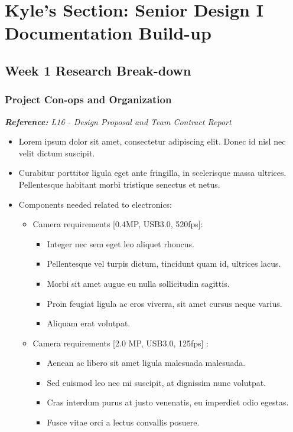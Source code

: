 \documentclass[11pt,letterpaper]{article}
\begin{document}
\tableofcontents
\newpage

\section{Kyle's Section: Senior Design I Documentation Build-up}
\subsection{Week 1 Research Break-down}
\subsubsection{Project Con-ops and Organization}
\textit{\footnotesize{\textbf{Reference:} L16 - Design Proposal and Team Contract Report}} 
\begin{itemize} %
	\item Lorem ipsum dolor sit amet, consectetur adipiscing elit. Donec id nisl nec velit dictum suscipit. 
	\item Curabitur porttitor ligula eget ante fringilla, in scelerisque massa ultrices. Pellentesque habitant morbi tristique senectus et netus.
	\item Components needed related to electronics:
	\begin{itemize}[label=$-$] %
		\item Camera requirements [0.4MP, USB3.0, 520fps]: 
			\begin{itemize} %
			\item Integer nec sem eget leo aliquet rhoncus.
			\item Pellentesque vel turpis dictum, tincidunt quam id, ultrices lacus.
			\item Morbi sit amet augue eu nulla sollicitudin sagittis.
			\item Proin feugiat ligula ac eros viverra, sit amet cursus neque varius. 
			\item Aliquam erat volutpat.
			\end{itemize}
			
		\item Camera requirements [2.0 MP, USB3.0, 125fps] : 
			\begin{itemize} %
			\item Aenean ac libero sit amet ligula malesuada malesuada.
			\item Sed euismod leo nec mi suscipit, at dignissim nunc volutpat.
			\item Cras interdum purus at justo venenatis, eu imperdiet odio egestas.
			\item Fusce vitae orci a lectus convallis posuere.
			\end{itemize}
	\end{itemize}
\end{itemize}
\end{document}
